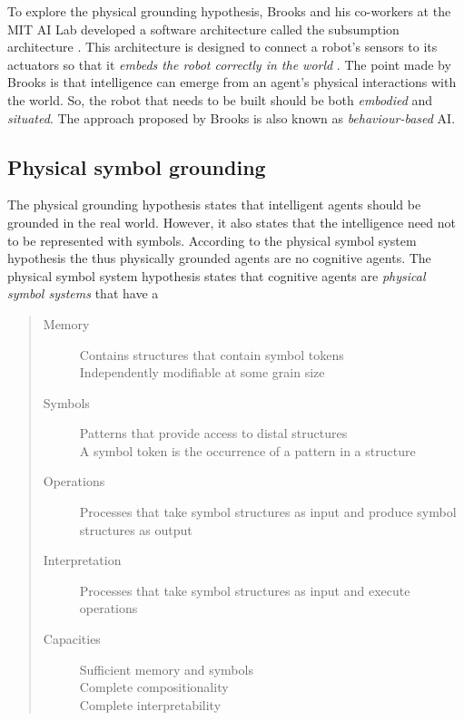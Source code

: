 
To explore the physical grounding hypothesis, Brooks and his co-workers at the MIT AI Lab developed a software architecture called the {\sc subsumption architecture} \citep{brooks:1986}. This architecture is designed to connect a robot's sensors to its actuators so that it {\em embeds the robot correctly in the world} \citep{brooks:1990}.  The point made by Brooks is that intelligence can emerge from an agent's physical interactions with the world. So, the robot that needs to be built should be both {\em embodied} and {\em situated}. The approach proposed by Brooks is also known as {\em behaviour-based} AI.


\subsection{Physical symbol grounding}

The physical grounding hypothesis \citep{brooks:1990} states that intelligent agents should be grounded in the real world. However, it also states that the intelligence need not to be represented with symbols. According to the physical symbol system hypothesis the thus physically grounded agents are no cognitive agents. The physical symbol system hypothesis \citep{newell:1980} states that cognitive agents are {\em physical symbol systems} that have a  \cite[77]{newell:1990}

\begin{quote}
\begin{description}
\item[Memory]
Contains structures that contain symbol tokens\\
Independently modifiable at some grain size

\item[Symbols]
Patterns that provide access to distal structures\\
A symbol token is the occurrence of a pattern in a structure

\item[Operations]
Processes that take symbol structures as input and produce symbol structures as output

\item[Interpretation]
Processes that take symbol structures as input and execute operations

\item[Capacities]
Sufficient memory and symbols\\
Complete compositionality\\
Complete interpretability
\end{description}
\end{quote}


